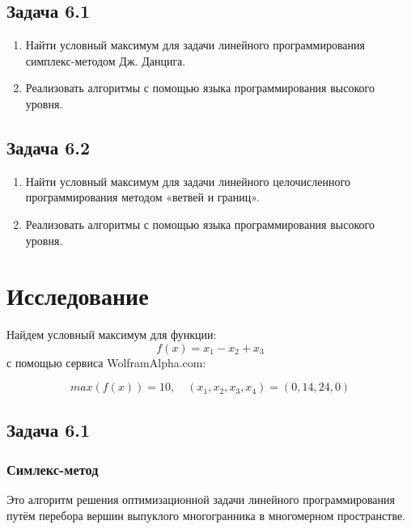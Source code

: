 \documentclass[a4paper, 12pt]{article}   	%
\begin{document}
\subsection{Задача 6.1}

    \begin{enumerate}
        \item Найти условный максимум для задачи линейного программирования симплекс-методом Дж. Данцига.
        \item Реализовать алгоритмы с помощью языка программирования высокого уровня.
    \end{enumerate}
    
\subsection{Задача 6.2}

    \begin{enumerate}
        \item Найти условный максимум для задачи линейного целочисленного программирования методом «ветвей и границ».
        \item Реализовать алгоритмы с помощью языка программирования высокого уровня.
    \end{enumerate}
    
    
\newpage
\section{Исследование}
    Найдем условный максимум для функции:
    \begin{equation}
          f(x) = x_1 - x_2 + x_3
    \end{equation}
    с помощью сервиса WolframAlpha.com:
    
     \begin{equation}
        max(f(x)) = 10,\quad (x_1, x_2, x_3, x_4) = (0, 14, 24, 0)
    \end{equation}
    
\subsection{Задача 6.1}

    \subsubsection{Симлекс-метод}
        Это алгоритм решения оптимизационной задачи линейного программирования путём перебора вершин выпуклого многогранника в многомерном пространстве.
\end{document}
